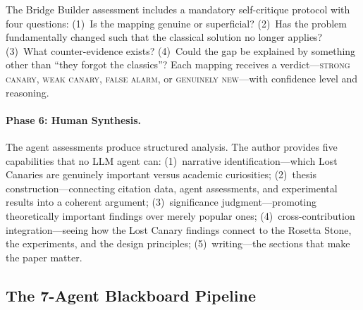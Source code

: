 \documentclass{article}
\begin{document}
\noindent
The Bridge Builder assessment includes a mandatory self-critique protocol with four
questions: (1)~Is the mapping genuine or superficial? (2)~Has the problem fundamentally
changed such that the classical solution no longer applies? (3)~What counter-evidence
exists? (4)~Could the gap be explained by something other than ``they forgot the
classics''? Each mapping receives a verdict---\textsc{strong canary}, \textsc{weak
canary}, \textsc{false alarm}, or \textsc{genuinely new}---with confidence level and
reasoning.

\paragraph{Phase 6: Human Synthesis.}
The agent assessments produce structured analysis. The author provides five capabilities
that no LLM agent can: (1)~narrative identification---which Lost Canaries are genuinely
important versus academic curiosities; (2)~thesis construction---connecting citation
data, agent assessments, and experimental results into a coherent argument;
(3)~significance judgment---promoting theoretically important findings over merely
popular ones; (4)~cross-contribution integration---seeing how the Lost Canary findings
connect to the Rosetta Stone, the experiments, and the design principles;
(5)~writing---the sections that make the paper matter.

\subsection{The 7-Agent Blackboard Pipeline}
\label{sec:meth-pipeline}
\end{document}
